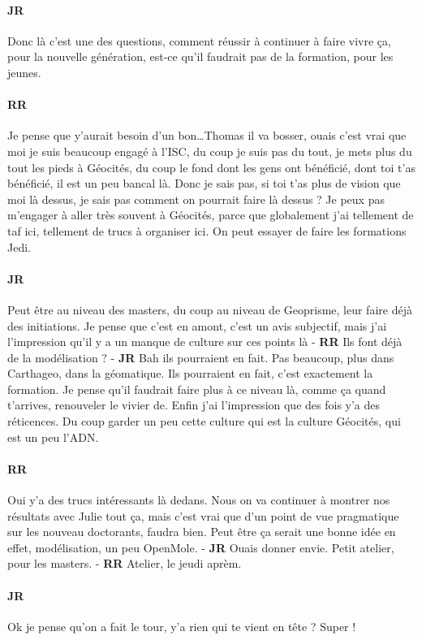 \documentclass[12pt]{article}
\begin{document}




\paragraph{JR}

Donc là c'est une des questions, comment réussir à continuer à faire vivre ça, pour la nouvelle génération, est-ce qu'il faudrait pas de la formation, pour les jeunes.

\paragraph{RR}

Je pense que y'aurait besoin d'un bon\ldots Thomas il va bosser, ouais c'est vrai que moi je suis beaucoup engagé à l'ISC, du coup je suis pas du tout, je mets plus du tout les pieds à Géocités, du coup le fond dont les gens ont bénéficié, dont toi t'as bénéficié, il est un peu bancal là. Donc je sais pas, si toi t'as plus de vision que moi là dessus, je sais pas comment on pourrait faire là dessus ? Je peux pas m'engager à aller très souvent à Géocités, parce que globalement j'ai tellement de taf ici, tellement de trucs à organiser ici. On peut essayer de faire les formations Jedi. %

\paragraph{JR}

Peut être au niveau des masters, du coup au niveau de Geoprisme, leur faire déjà des initiations. Je pense que c'est en amont, c'est un avis subjectif, mais j'ai l'impression qu'il y a un manque de culture sur ces points là - \textbf{RR} Ils font déjà de la modélisation ? - \textbf{JR} Bah ils pourraient en fait. Pas beaucoup, plus dans Carthageo, dans la géomatique. Ils pourraient en fait, c'est exactement la formation. Je pense qu'il faudrait faire plus à ce niveau là, comme ça quand t'arrives, renouveler le vivier de. Enfin j'ai l'impression que des fois y'a des réticences. Du coup garder un peu cette culture qui est la culture Géocités, qui est un peu l'ADN. 

\paragraph{RR}

Oui y'a des trucs intéressants là dedans. Nous on va continuer à montrer nos résultats avec Julie tout ça, mais c'est vrai que d'un point de vue pragmatique sur les nouveau doctorants, faudra bien. Peut être ça serait une bonne idée en effet, modélisation, un peu OpenMole. - \textbf{JR} Ouais donner envie. Petit atelier, pour les masters. %
- \textbf{RR} Atelier, le jeudi aprèm.

\paragraph{JR}

Ok je pense qu'on a fait le tour, y'a rien qui te vient en tête ? Super !

\end{document}
